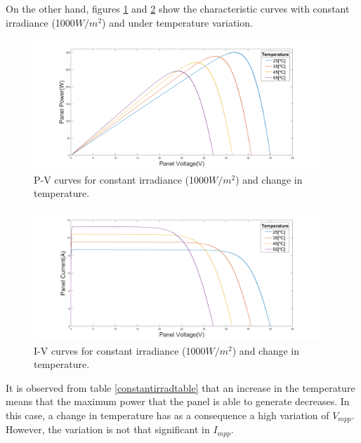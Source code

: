 On the other hand, figures \ref{fig:PVcurves_Irr1000} and \ref{fig:IVcurves_Irr1000} show the characteristic curves with constant irradiance (1000$W/ m^2$) and under temperature variation.

\begin{figure}[H]
	\begin{center}
		\includegraphics[width=0.96\textwidth]{../Pictures/constant_irradiance}
		\caption{P-V curves for constant irradiance (1000$W/ m^2$) and change in temperature.}
		\label{fig:PVcurves_Irr1000} 
	\end{center}	
\end{figure}


\begin{figure}[H]
	\begin{center}
		\includegraphics[width=0.96\textwidth]{../Pictures/iv_constant_irradiance}
		\caption{I-V curves for constant irradiance (1000$W/ m^2$) and change in temperature.}
		\label{fig:IVcurves_Irr1000} 
	\end{center}	
\end{figure}

 It is observed from table \ref{constantirradtable} that an increase in the temperature means that the maximum power that the panel is able to generate decreases. In this case, a change in temperature has as a consequence a high variation of $V_{mpp}$. However, the variation is not that significant in $I_{mpp}$.
 

